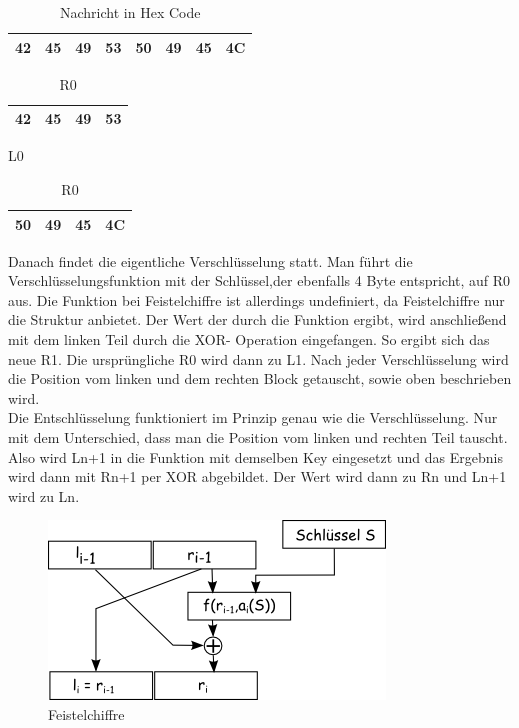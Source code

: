 \documentclass[course=asp]{aspdoc}
\begin{document}
\begin{table}[H]
\centering
    \begin{tabular}{|l|l|l|l|l|l|l|l|}
        \hline
        42 & 45 & 49 & 53 & 50 & 49 & 45 & 4C   \\
        \hline
    \end{tabular}
    \caption{Nachricht in Hex Code}
\end{table}



\begin{table}[H]

    \begin{minipage}{.5\linewidth}

      \centering
        \begin{tabular}{|l|l|l|l|}
		\hline
            42 & 45 & 49 & 53   \\
		\hline
        \end{tabular}

	\caption{L0}
    \end{minipage}%
    \begin{minipage}{.5\linewidth}

 \centering

        \begin{tabular}{|l|l|l|l|}
           \hline
		 50 & 49 & 45 & 4C   \\
		\hline
        \end{tabular}
\caption{R0}
    \end{minipage}
\end{table}
Danach findet die eigentliche Verschlüsselung statt. Man führt die Verschlüsselungsfunktion mit der Schlüssel,der ebenfalls 4 Byte entspricht, auf R0 aus. Die Funktion bei Feistelchiffre ist allerdings undefiniert, da Feistelchiffre nur die Struktur anbietet. Der Wert der durch die Funktion ergibt, wird anschließend mit dem linken Teil durch die XOR- Operation eingefangen. So ergibt sich das neue R1. Die ursprüngliche R0 wird dann zu L1. Nach jeder Verschlüsselung wird die Position vom linken und dem rechten Block getauscht, sowie oben beschrieben wird.\\
Die Entschlüsselung funktioniert im Prinzip genau wie die Verschlüsselung. Nur mit dem Unterschied, dass man die Position vom linken und rechten Teil tauscht. Also wird Ln+1 in die Funktion mit demselben Key eingesetzt und das Ergebnis wird dann mit Rn+1 per XOR abgebildet. Der Wert wird dann zu Rn und Ln+1 wird zu Ln.~\cite{feistelchipher}

\begin{figure}[h]
\centering
\includegraphics[scale = 0.4]{feistel.png}
\caption{Feistelchiffre}
\end{figure}
\newpage
\end{document}
